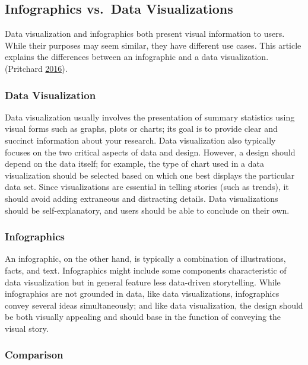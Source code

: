\documentclass[]{book}
\begin{document}
\subsection{Infographics vs.~Data
Visualizations}\label{infographics-vs.data-visualizations}

Data visualization and infographics both present visual information to
users. While their purposes may seem similar, they have different use
cases. This article explains the differences between an infographic and
a data visualization. (Pritchard
\protect\hyperlink{ref-VIZVSINFO}{2016}).

\subsubsection{Data Visualization}\label{data-visualization}

Data visualization usually involves the presentation of summary
statistics using visual forms such as graphs, plots or charts; its goal
is to provide clear and succinct information about your research. Data
visualization also typically focuses on the two critical aspects of data
and design. However, a design should depend on the data itself; for
example, the type of chart used in a data visualization should be
selected based on which one best displays the particular data set. Since
visualizations are essential in telling stories (such as trends), it
should avoid adding extraneous and distracting details. Data
visualizations should be self-explanatory, and users should be able to
conclude on their own.

\subsubsection{Infographics}\label{infographics}

An infographic, on the other hand, is typically a combination of
illustrations, facts, and text. Infographics might include some
components characteristic of data visualization but in general feature
less data-driven storytelling. While infographics are not grounded in
data, like data visualizations, infographics convey several ideas
simultaneously; and like data visualization, the design should be both
visually appealing and should base in the function of conveying the
visual story.

\subsubsection{Comparison}\label{comparison}
\end{document}
